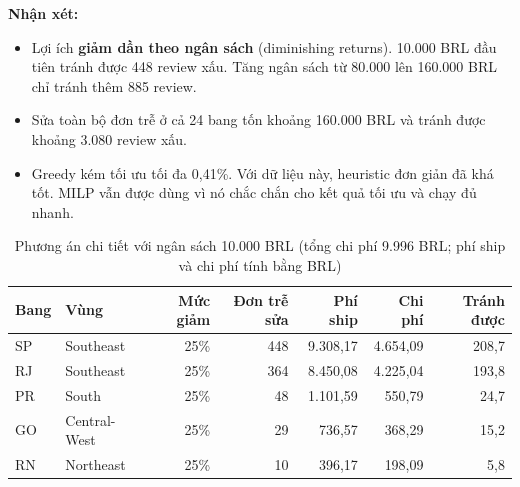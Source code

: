 \documentclass[12pt,a4paper]{report}
\renewcommand{\_}{\oldunderscore\allowbreak}
\begin{document}
\textbf{Nhận xét:}
\begin{itemize}
\item Lợi ích \textbf{giảm dần theo ngân sách} (diminishing returns). 10.000 BRL đầu tiên tránh được 448 review xấu. Tăng ngân sách từ 80.000 lên 160.000 BRL chỉ tránh thêm 885 review.
\item Sửa toàn bộ đơn trễ ở cả 24 bang tốn khoảng 160.000 BRL và tránh được khoảng 3.080 review xấu.
\item Greedy kém tối ưu tối đa 0,41\%. Với dữ liệu này, heuristic đơn giản đã khá tốt. MILP vẫn được dùng vì nó chắc chắn cho kết quả tối ưu và chạy đủ nhanh.
\end{itemize}

\begin{table}[H]
\centering\small
\caption{Phương án chi tiết với ngân sách 10.000 BRL (tổng chi phí 9.996 BRL; phí ship và chi phí tính bằng BRL)}
\begin{tabular}{llrrrrr}
\toprule
Bang & Vùng & Mức giảm & Đơn trễ sửa & Phí ship & Chi phí & Tránh được \\
\midrule
SP & Southeast & 25\% & 448 & 9.308,17 & 4.654,09 & 208,7 \\
RJ & Southeast & 25\% & 364 & 8.450,08 & 4.225,04 & 193,8 \\
PR & South & 25\% & 48 & 1.101,59 & 550,79 & 24,7 \\
GO & Central-West & 25\% & 29 & 736,57 & 368,29 & 15,2 \\
RN & Northeast & 25\% & 10 & 396,17 & 198,09 & 5,8 \\
\bottomrule
\end{tabular}
\end{table}
\end{document}
